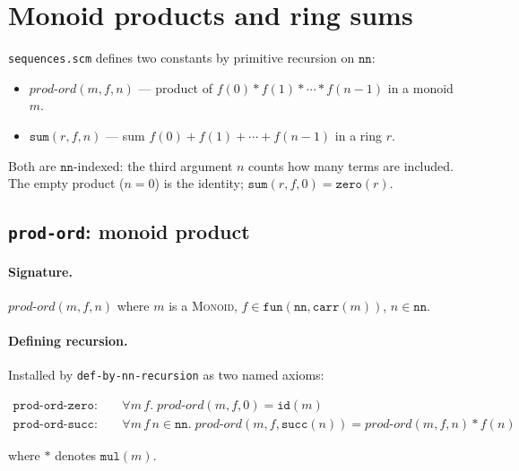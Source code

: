 \section{Monoid products and ring sums}
\label{sec:sequences}

\texttt{sequences.scm} defines two constants by primitive recursion on
$\mathtt{nn}$:

\begin{itemize}
\item $\mathit{prod\text{-}ord}(m, f, n)$ --- product of $f(0) * f(1) * \cdots * f(n{-}1)$
  in a monoid $m$.
\item $\mathtt{sum}(r, f, n)$ --- sum $f(0) + f(1) + \cdots + f(n{-}1)$
  in a ring $r$.
\end{itemize}

Both are $\mathtt{nn}$-indexed: the third argument $n$ counts how many
terms are included.  The empty product ($n = 0$) is the identity;
$\mathtt{sum}(r, f, 0) = \mathtt{zero}(r)$.

\subsection{\texttt{prod-ord}: monoid product}

\paragraph{Signature.}
$\mathit{prod\text{-}ord}(m, f, n)$ where $m$ is a \textsc{Monoid},
$f \in \mathtt{fun}(\mathtt{nn}, \mathtt{carr}(m))$, $n \in \mathtt{nn}$.

\paragraph{Defining recursion.}
Installed by \texttt{def-by-nn-recursion} as two named axioms:

\begin{align*}
\mathtt{prod\text{-}ord\text{-}zero}: &\quad
  \forall m\, f.\;
  \mathit{prod\text{-}ord}(m, f, 0) = \mathtt{id}(m) \\
\mathtt{prod\text{-}ord\text{-}succ}: &\quad
  \forall m\, f\, n \in \mathtt{nn}.\;
  \mathit{prod\text{-}ord}(m, f, \mathtt{succ}(n))
  = \mathit{prod\text{-}ord}(m, f, n) * f(n)
\end{align*}

where $*$ denotes $\mathtt{mul}(m)$.


